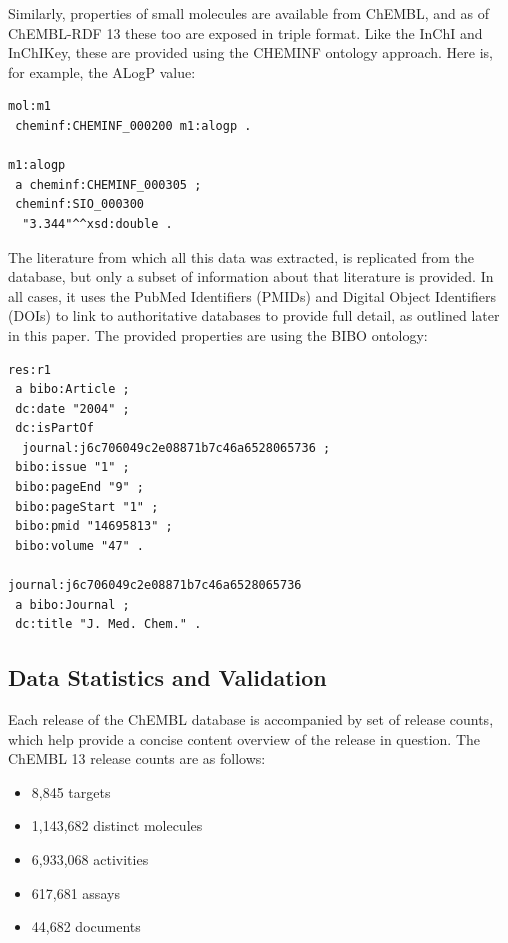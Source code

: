 \documentclass[10pt]{bmc_article}
\newenvironment{bmcformat}{\begin{raggedright}\baselineskip20pt\sloppy\setboolean{publ}{false}}{\end{raggedright}\baselineskip20pt\sloppy}
\begin{document}
\begin{bmcformat}
Similarly, properties of small molecules are available from ChEMBL, and as of ChEMBL-RDF 13
these too are exposed in triple format. Like the InChI and InChIKey, these are provided using the
CHEMINF ontology approach. Here is, for example, the ALogP value:

\begin{small}
\begin{verbatim}
mol:m1
 cheminf:CHEMINF_000200 m1:alogp .

m1:alogp
 a cheminf:CHEMINF_000305 ;
 cheminf:SIO_000300
  "3.344"^^xsd:double .
\end{verbatim}
\end{small}

The literature from which all this data was extracted, is replicated from the database,
but only a subset of information about that literature is provided. In all cases,
it uses the PubMed Identifiers (PMIDs) and Digital Object Identifiers (DOIs) to link
to authoritative databases to provide full detail, as outlined later in this paper.
The provided properties are using the BIBO ontology:

\begin{small}
\begin{verbatim}
res:r1
 a bibo:Article ;
 dc:date "2004" ;
 dc:isPartOf
  journal:j6c706049c2e08871b7c46a6528065736 ;
 bibo:issue "1" ;
 bibo:pageEnd "9" ;
 bibo:pageStart "1" ;
 bibo:pmid "14695813" ;
 bibo:volume "47" .

journal:j6c706049c2e08871b7c46a6528065736
 a bibo:Journal ;
 dc:title "J. Med. Chem." .
\end{verbatim}
\end{small}

\subsection*{Data Statistics and Validation}

Each release of the ChEMBL database is accompanied by set of release counts, which help 
provide a concise content overview of the release in question. The ChEMBL 13 release counts
are as follows:
\begin{itemize}
  \item 8,845 targets
  \item 1,143,682 distinct molecules
  \item 6,933,068 activities
  \item 617,681 assays
  \item 44,682 documents
\end{itemize}


\end{bmcformat}
\end{document}
